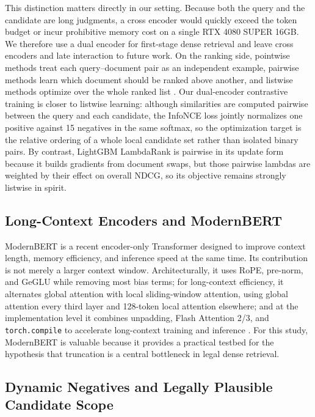 This distinction matters directly in our setting. Because both the query and the candidate are long judgments, a cross encoder would quickly exceed the token budget or incur prohibitive memory cost on a single RTX 4080 SUPER 16GB. We therefore use a dual encoder for first-stage dense retrieval and leave cross encoders and late interaction to future work. On the ranking side, pointwise methods treat each query--document pair as an independent example, pairwise methods learn which document should be ranked above another, and listwise methods optimize over the whole ranked list \cite{burges2005ranknet,cao2007listnet,liu2009ltr}. Our dual-encoder contrastive training is closer to listwise learning: although similarities are computed pairwise between the query and each candidate, the InfoNCE loss jointly normalizes one positive against 15 negatives in the same softmax, so the optimization target is the relative ordering of a whole local candidate set rather than isolated binary pairs. By contrast, LightGBM LambdaRank is pairwise in its update form because it builds gradients from document swaps, but those pairwise lambdas are weighted by their effect on overall NDCG, so its objective remains strongly listwise in spirit.

\subsection{Long-Context Encoders and ModernBERT}

ModernBERT \cite{warner2024modernbert} is a recent encoder-only Transformer designed to improve context length, memory efficiency, and inference speed at the same time. Its contribution is not merely a larger context window. Architecturally, it uses RoPE, pre-norm, and GeGLU while removing most bias terms; for long-context efficiency, it alternates global attention with local sliding-window attention, using global attention every third layer and 128-token local attention elsewhere; and at the implementation level it combines unpadding, Flash Attention 2/3, and \texttt{torch.compile} to accelerate long-context training and inference \cite{warner2024modernbert}. For this study, ModernBERT is valuable because it provides a practical testbed for the hypothesis that truncation is a central bottleneck in legal dense retrieval.

\subsection{Dynamic Negatives and Legally Plausible Candidate Scope}

